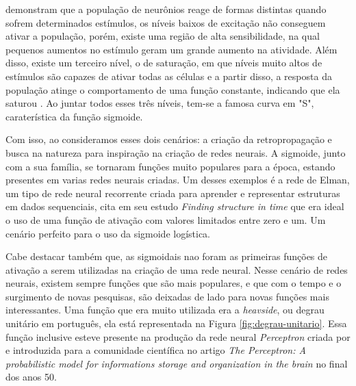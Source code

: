 \textcite{SigmoidWilsonCowan} demonstram que a população de neurônios reage de formas distintas quando sofrem determinados estímulos, os níveis baixos de excitação não conseguem ativar a população, porém, existe uma região de alta sensibilidade, na qual pequenos aumentos no estímulo geram um grande aumento na atividade. Além disso, existe um terceiro nível, o de saturação, em que níveis muito altos de estímulos são capazes de ativar todas as células e a partir disso, a resposta da população atinge o comportamento de uma função constante, indicando que ela saturou \parencite{SigmoidWilsonCowan}. Ao juntar todos esses três níveis, tem-se a famosa curva em "S", caraterística da função sigmoide.

Com isso, ao consideramos esses dois cenários: a criação da retropropagação e busca na natureza para inspiração na criação de redes neurais. A sigmoide, junto com a sua família, se tornaram funções muito populares para a época, estando presentes em varias redes neurais criadas. Um desses exemplos é a rede de Elman, um tipo de rede neural recorrente criada para aprender e representar estruturas em dados sequenciais, \textcite{ElmanNetwork} cita em seu estudo \textit{Finding structure in time} que era ideal o uso de uma função de ativação com valores limitados entre zero e um. Um cenário perfeito para o uso da sigmoide logística.

Cabe destacar também que, as sigmoidais nao foram as primeiras funções de ativação a serem utilizadas na criação de uma rede neural. Nesse cenário de redes neurais, existem sempre funções que são mais populares, e que com o tempo e o surgimento de novas pesquisas, são deixadas de lado para novas funções mais interessantes. Uma função que era muito utilizada era a \textit{heavside}, ou degrau unitário em português, ela está representada na Figura \ref{fig:degrau-unitario}. Essa função inclusive esteve presente na produção da rede neural \textit{Perceptron} criada por \textcite{PerceptronRosenblatt} e introduzida para a comunidade científica no artigo \textit{The Perceptron: A probabilistic model for informations storage and organization in the brain} no final dos anos 50.

